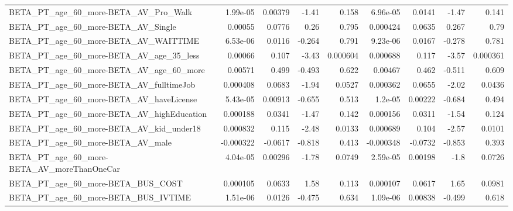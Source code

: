 \begin{tabular}{lrrrrrrrr}
BETA\_PT\_age\_60\_more-BETA\_AV\_Pro\_Walk               &    1.99e-05 &      0.00379 &    -1.41 &    0.158 &   6.96e-05 &      0.0141 &        -1.47 &         0.141 \\
BETA\_PT\_age\_60\_more-BETA\_AV\_Single                 &     0.00055 &       0.0776 &     0.26 &    0.795 &   0.000424 &      0.0635 &        0.267 &          0.79 \\
BETA\_PT\_age\_60\_more-BETA\_AV\_WAITTIME               &    6.53e-06 &       0.0116 &   -0.264 &    0.791 &   9.23e-06 &      0.0167 &       -0.278 &         0.781 \\
BETA\_PT\_age\_60\_more-BETA\_AV\_age\_35\_less            &     0.00066 &        0.107 &    -3.43 & 0.000604 &   0.000688 &       0.117 &        -3.57 &      0.000361 \\
BETA\_PT\_age\_60\_more-BETA\_AV\_age\_60\_more            &     0.00571 &        0.499 &   -0.493 &    0.622 &    0.00467 &       0.462 &       -0.511 &         0.609 \\
BETA\_PT\_age\_60\_more-BETA\_AV\_fulltimeJob            &    0.000408 &       0.0683 &    -1.94 &   0.0527 &   0.000362 &      0.0655 &        -2.02 &        0.0436 \\
BETA\_PT\_age\_60\_more-BETA\_AV\_haveLicense            &    5.43e-05 &      0.00913 &   -0.655 &    0.513 &    1.2e-05 &     0.00222 &       -0.684 &         0.494 \\
BETA\_PT\_age\_60\_more-BETA\_AV\_highEducation          &    0.000188 &       0.0341 &    -1.47 &    0.142 &   0.000156 &      0.0311 &        -1.54 &         0.124 \\
BETA\_PT\_age\_60\_more-BETA\_AV\_kid\_under18            &    0.000832 &        0.115 &    -2.48 &   0.0133 &   0.000689 &       0.104 &        -2.57 &        0.0101 \\
BETA\_PT\_age\_60\_more-BETA\_AV\_male                   &   -0.000322 &      -0.0617 &   -0.818 &    0.413 &  -0.000348 &     -0.0732 &       -0.853 &         0.393 \\
BETA\_PT\_age\_60\_more-BETA\_AV\_moreThanOneCar         &    4.04e-05 &      0.00296 &    -1.78 &   0.0749 &   2.59e-05 &     0.00198 &         -1.8 &        0.0726 \\
BETA\_PT\_age\_60\_more-BETA\_BUS\_COST                  &    0.000105 &       0.0633 &     1.58 &    0.113 &   0.000107 &      0.0617 &         1.65 &        0.0981 \\
BETA\_PT\_age\_60\_more-BETA\_BUS\_IVTIME                &    1.51e-06 &       0.0126 &   -0.475 &    0.634 &   1.09e-06 &     0.00838 &       -0.499 &         0.618 \\

\end{tabular}
